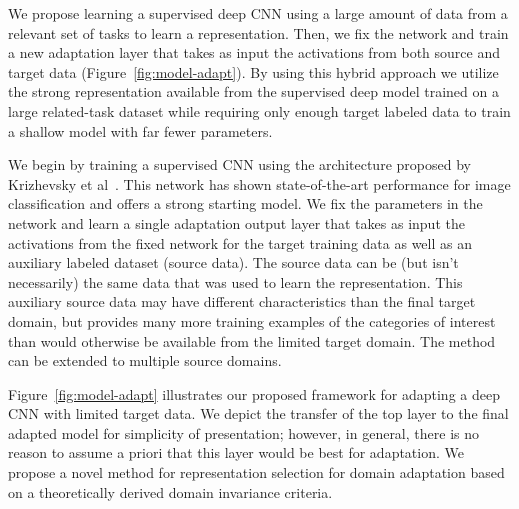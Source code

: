 
We propose learning a supervised deep CNN using a large amount of
data from a relevant set of tasks to learn a representation. Then, we fix the network and train a new adaptation layer
that takes as input the activations from both source and target data (Figure~\ref{fig:model-adapt}). By
using this hybrid approach we utilize the strong representation available from
the supervised deep model trained on a large related-task dataset while requiring only
enough target labeled data to train a shallow model with far fewer parameters.

We begin by training a supervised CNN using the architecture proposed by 
Krizhevsky et al~\cite{supervision}. This network has shown state-of-the-art
performance for image classification and offers a strong starting model.
We fix the 
parameters in the
network and learn a single adaptation output layer that takes as input
the activations from the fixed network for the target training data as well as an auxiliary labeled
dataset (source data). The source data
can be (but isn't necessarily) the same data that was used to learn the representation.
This auxiliary source data may have different characteristics than the final target domain, but
provides many more training examples of the categories of interest than would otherwise be available from the limited target domain. The method can be extended to multiple source domains.

Figure~\ref{fig:model-adapt} illustrates our proposed framework for adapting a deep CNN with limited target data.
We depict the transfer of the top layer to the final adapted model for simplicity of presentation; however, in general, there is no reason to assume a priori that this layer would be best for adaptation.
We propose a novel method for representation selection for domain adaptation based on a theoretically derived domain invariance criteria.


